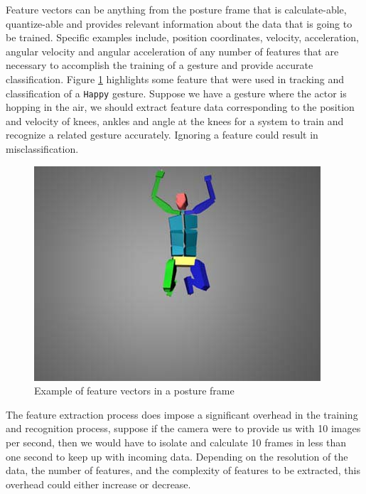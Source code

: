 \documentclass[]{report}   %
\begin{document}
Feature vectors can be anything from the posture frame that is calculate-able, quantize-able and provides relevant information about the data that is going to be trained. Specific examples include, position coordinates, velocity, acceleration, angular velocity and angular acceleration of any number of features that are necessary to accomplish the training of a gesture and provide accurate classification. Figure \ref{fig:fv1} highlights some feature that were used in tracking and classification of a \texttt{Happy} gesture. Suppose we have a gesture where the actor is hopping in the air, we should extract feature data corresponding to the position and velocity of knees, ankles and angle at the knees for a system to train and recognize a related gesture accurately. Ignoring a feature could result in misclassification.

\begin{figure}[htbp]
	\centering
		\includegraphics[scale=0.5]{aff2.jpg}
	\caption{Example of feature vectors in a posture frame\cite{Kleinsmith:2006:CDR:1221613.1222203}}
	\label{fig:fv1}
\end{figure}

The feature extraction process does impose a significant overhead in the training and recognition process, suppose if the camera were to provide us with 10 images per second, then we would have to isolate and calculate 10 frames in less than one second to keep up with incoming data. Depending on the resolution of the data, the number of features, and the complexity of features to be extracted, this overhead could either increase or decrease.
 
\end{document}

